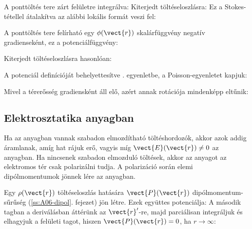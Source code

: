    A ponttöltés tere zárt felületre integrálva:
   Kiterjedt töltéseloszlásra:
   Ez a Stokes-tétellel átalakítva az alábbi lokális formát veszi fel:
   
   A ponttöltés tere felírható egy $\phi(\vect{r})$ skalárfüggvény negatív gradienseként, ez a potenciálfüggvény:
   
   Kiterjedt töltéseloszlásra hasonlóan:
   
   A potenciál definícióját behelyettesítve . egyenletbe, a Poisson-egyenletet kapjuk:
   
   Mivel a térerősség gradiensként áll elő, azért annak rotációja mindenképp eltűnik:
   
  \subsection{Elektrosztatika anyagban}\label{ss1:elsztat}
   
   Ha az anyagban vannak szabadon elmozdítható töltéshordozók, akkor azok addig áramlanak, amíg hat rájuk erő, vagyis míg $\vect{E}(\vect{r})\ne 0$ az anyagban.
   Ha nincsenek szabadon elmozduló töltések, akkor az anyagot az elektromos tér csak polarizálni tudja.
   A polarizáció során elemi dipólmomentumok jönnek lére az anyagban. 
   
   Egy $\rho(\vect{r})$ töltéseloszlás  hatására $\vect{P}(\vect{r})$ dipólmomentum-sűrűség (\ref{ss:A06-dipol}. fejezet) jön létre.
   Ezek együttes potenciálja:
   A második tagban a deriválásban áttérünk az $\vect{r}'$-re, majd parciálisan integráljuk és elhagyjuk a felületi tagot, hiszen $\vect{P}(\vect{r})=0$, ha $r\to\infty$:
   
